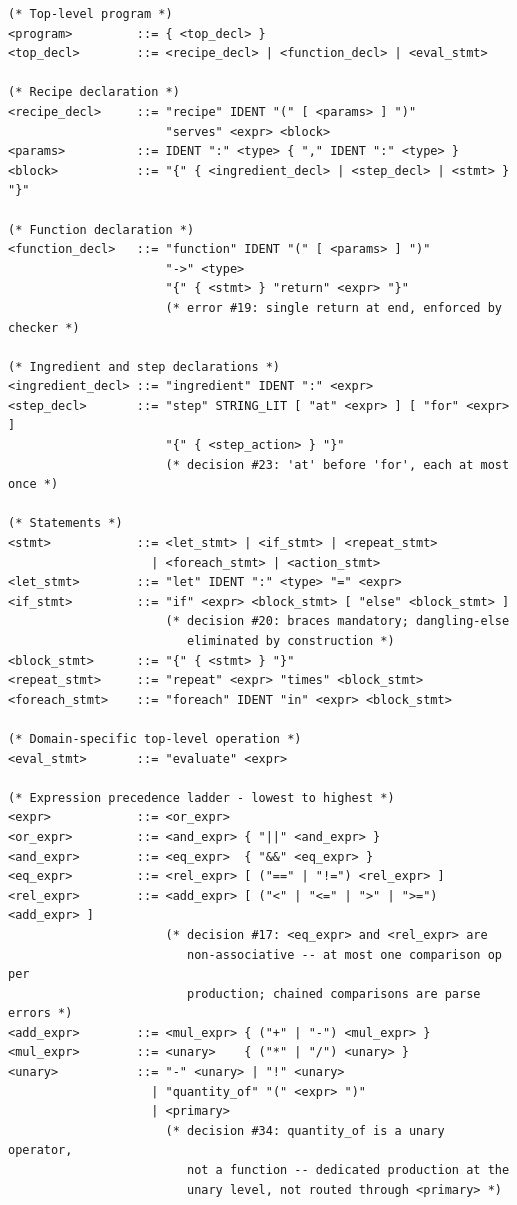 \documentclass[11pt,a4paper]{article}
\begin{document}
\begin{lstlisting}
(* Top-level program *)
<program>         ::= { <top_decl> }
<top_decl>        ::= <recipe_decl> | <function_decl> | <eval_stmt>

(* Recipe declaration *)
<recipe_decl>     ::= "recipe" IDENT "(" [ <params> ] ")"
                      "serves" <expr> <block>
<params>          ::= IDENT ":" <type> { "," IDENT ":" <type> }
<block>           ::= "{" { <ingredient_decl> | <step_decl> | <stmt> } "}"

(* Function declaration *)
<function_decl>   ::= "function" IDENT "(" [ <params> ] ")"
                      "->" <type>
                      "{" { <stmt> } "return" <expr> "}"
                      (* error #19: single return at end, enforced by checker *)

(* Ingredient and step declarations *)
<ingredient_decl> ::= "ingredient" IDENT ":" <expr>
<step_decl>       ::= "step" STRING_LIT [ "at" <expr> ] [ "for" <expr> ]
                      "{" { <step_action> } "}"
                      (* decision #23: 'at' before 'for', each at most once *)

(* Statements *)
<stmt>            ::= <let_stmt> | <if_stmt> | <repeat_stmt>
                    | <foreach_stmt> | <action_stmt>
<let_stmt>        ::= "let" IDENT ":" <type> "=" <expr>
<if_stmt>         ::= "if" <expr> <block_stmt> [ "else" <block_stmt> ]
                      (* decision #20: braces mandatory; dangling-else
                         eliminated by construction *)
<block_stmt>      ::= "{" { <stmt> } "}"
<repeat_stmt>     ::= "repeat" <expr> "times" <block_stmt>
<foreach_stmt>    ::= "foreach" IDENT "in" <expr> <block_stmt>

(* Domain-specific top-level operation *)
<eval_stmt>       ::= "evaluate" <expr>

(* Expression precedence ladder - lowest to highest *)
<expr>            ::= <or_expr>
<or_expr>         ::= <and_expr> { "||" <and_expr> }
<and_expr>        ::= <eq_expr>  { "&&" <eq_expr> }
<eq_expr>         ::= <rel_expr> [ ("==" | "!=") <rel_expr> ]
<rel_expr>        ::= <add_expr> [ ("<" | "<=" | ">" | ">=") <add_expr> ]
                      (* decision #17: <eq_expr> and <rel_expr> are
                         non-associative -- at most one comparison op per
                         production; chained comparisons are parse errors *)
<add_expr>        ::= <mul_expr> { ("+" | "-") <mul_expr> }
<mul_expr>        ::= <unary>    { ("*" | "/") <unary> }
<unary>           ::= "-" <unary> | "!" <unary>
                    | "quantity_of" "(" <expr> ")"
                    | <primary>
                      (* decision #34: quantity_of is a unary operator,
                         not a function -- dedicated production at the
                         unary level, not routed through <primary> *)


\end{lstlisting}
\end{document}
